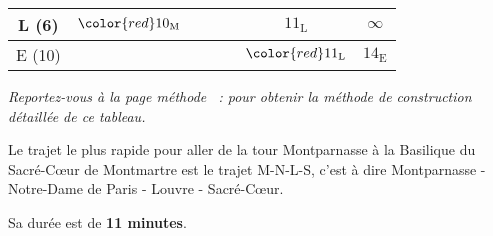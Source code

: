 \begin{corrige}
\begin{enumerate}
\begin{center}
\begin{extern}
\begin{tabularx}{0.9\linewidth}{|c|C|C|C|C|C|C|}
                         L (6)			&  $\color{red}10_{\text{M}}$	& 		& \cellcolor{black!20}		& 		& $11_{\text{L}}$				& $\infty$ 					\\ \hline
                         E (10)			&  		& 		& \cellcolor{black!20}		& 		& $\color{red}11_{\text{L}}$		& $14_{\text{E}}$	 		\\ \hline
                    \end{tabularx}
               \end{extern}
          \end{center}
          \textit{Reportez-vous à la page \og méthode \fg{}~:  pour obtenir la méthode de construction détaillée de ce tableau.}
          \par
          Le trajet le plus rapide pour aller de la tour Montparnasse à la Basilique du Sacré-Cœur de Montmartre est le trajet M-N-L-S, c'est à dire Montparnasse - Notre-Dame de Paris - Louvre - Sacré-Cœur.
          \par
          Sa durée est de \textbf{11 minutes}.
          \par
     \end{enumerate}
     \par
\end{corrige}
